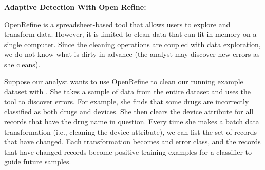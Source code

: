 \noindent\textbf{Adaptive Detection With Open Refine: }
\begin{example}
OpenRefine is a spreadsheet-based tool that allows users to explore and transform data.
However, it is limited to clean data that can fit in memory on a single computer.
Since the cleaning operations are coupled with data exploration, we do not know what is dirty in advance (the analyst may discover new errors as she cleans).

Suppose our analyst wants to use OpenRefine to clean our running example dataset with \sys.
She takes a sample of data from the entire dataset and uses the tool to discover errors.
For example, she finds that some drugs are incorrectly classified as both drugs and devices.
She then clears the device attribute for all records that have the drug name in question.
Every time she makes a batch data transformation (i.e., cleaning the device attribute), we can list the set of records that have changed.
Each transformation becomes and error class, and the records that have changed records become positive training examples for a classifier to guide future samples.
\end{example}